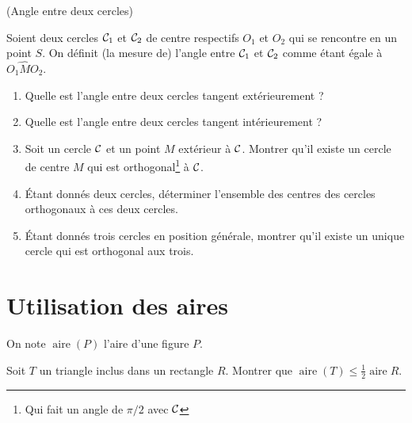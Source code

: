 \documentclass[a4paper,11pt,reqno]{amsart}
\DeclareMathOperator{\aire}{aire}
\begin{document}
\begin{exo} (Angle entre deux cercles)

  Soient deux cercles $\mathcal{C}_{1}$ et $\mathcal{C}_{2}$ de centre respectifs $O_{1}$ et $O_{2}$ qui se rencontre en un point $S$. On définit (la mesure de) l'angle entre $\mathcal{C}_{1}$ et $\mathcal{C}_{2}$ comme étant égale à $\widehat{O_{1}MO_{2}}$.
  \begin{enumerate}
    \item Quelle est l'angle entre deux cercles tangent extérieurement ?
    \item Quelle est l'angle entre deux cercles tangent intérieurement ?
    \item Soit un cercle $\mathcal{C}$ et un point $M$ extérieur à $\mathcal{C}$. Montrer qu'il existe un cercle de centre $M$ qui est orthogonal\footnote{Qui fait un angle de $\pi/2$ avec $\mathcal{C}$} à $\mathcal{C}$.
    \item Étant donnés deux cercles, déterminer l'ensemble des centres des cercles orthogonaux à ces deux cercles.
    \item Étant donnés trois cercles en position générale, montrer qu'il existe un unique cercle qui est orthogonal aux trois.
  \end{enumerate}
\end{exo}


\section{Utilisation des aires}

\begin{convention}
  On note $\aire (P)$ l'aire d'une figure $P$.
\end{convention}

\begin{exo}

  Soit $T$ un triangle inclus dans un rectangle $R$. Montrer que $\aire(T) \leqslant \frac{1}{2}\aire{R}$.
\end{exo}
\end{document}
